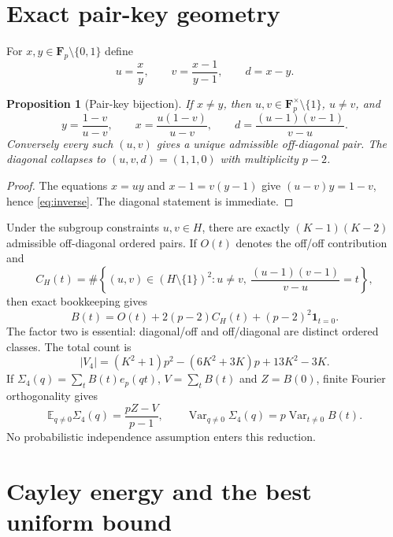 \documentclass[11pt]{article}
\newtheorem{proposition}[theorem]{Proposition}
\newcommand{\Fp}{\mathbf F_p}
\newcommand{\Var}{\operatorname{Var}}
\begin{document}
\section{Exact pair-key geometry}

For $x,y\in\Fp\setminus\{0,1\}$ define
\begin{equation}\label{eq:keydef}
 u=\frac{x}{y},\qquad
 v=\frac{x-1}{y-1},\qquad
 d=x-y.
\end{equation}

\begin{proposition}[Pair-key bijection]\label{prop:key}
If $x\ne y$, then $u,v\in\Fp^\times\setminus\{1\}$, $u\ne v$, and
\begin{equation}\label{eq:inverse}
 y=\frac{1-v}{u-v},\qquad
 x=\frac{u(1-v)}{u-v},\qquad
 d=\frac{(u-1)(v-1)}{v-u}.
\end{equation}
Conversely every such $(u,v)$ gives a unique admissible off-diagonal pair.
The diagonal collapses to $(u,v,d)=(1,1,0)$ with multiplicity $p-2$.
\end{proposition}

\begin{proof}
The equations $x=uy$ and $x-1=v(y-1)$ give $(u-v)y=1-v$, hence
\eqref{eq:inverse}.  The diagonal statement is immediate.
\end{proof}

Under the subgroup constraints $u,v\in H$, there are exactly
$(K-1)(K-2)$ admissible off-diagonal ordered pairs.  If $O(t)$ denotes the
off/off contribution and
\[
C_H(t)=\#\left\{(u,v)\in(H\setminus\{1\})^2:
 u\ne v,\ \frac{(u-1)(v-1)}{v-u}=t\right\},
\]
then exact bookkeeping gives
\begin{equation}\label{eq:Bdecomp}
B(t)=O(t)+2(p-2)C_H(t)+(p-2)^2\mathbf1_{t=0}.
\end{equation}
The factor two is essential: diagonal/off and off/diagonal are distinct ordered
classes.  The total count is
\begin{equation}\label{eq:V4}
|V_4|=(K^2+1)p^2-(6K^2+3K)p+13K^2-3K.
\end{equation}
If $\Sigma_4(q)=\sum_tB(t)e_p(qt)$, $V=\sum_tB(t)$ and $Z=B(0)$, finite
Fourier orthogonality gives
\begin{equation}\label{eq:meanvar}
\mathbb E_{q\ne0}\Sigma_4(q)=\frac{pZ-V}{p-1},
\qquad
\Var_{q\ne0}\Sigma_4(q)=p\Var_{t\ne0}B(t).
\end{equation}
No probabilistic independence assumption enters this reduction.

\section{Cayley energy and the best uniform bound}
\end{document}
